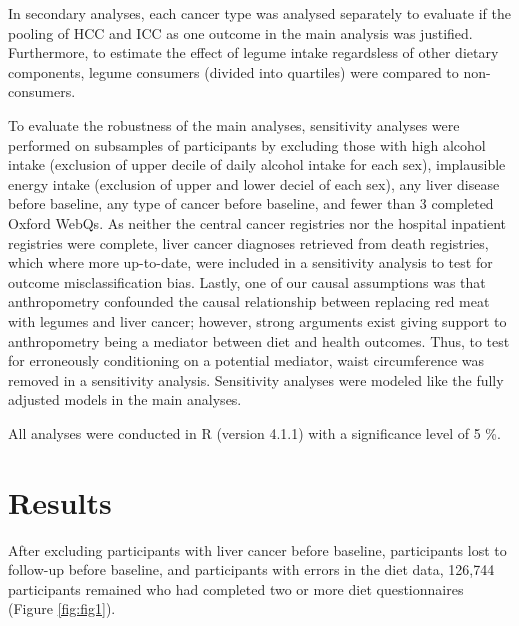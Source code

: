 \documentclass[sn-basic,Numbered,iicol,pdflatex]{sn-jnl}
\begin{document}
In secondary analyses, each cancer type was analysed separately to
evaluate if the pooling of HCC and ICC as one outcome in the main
analysis was justified. Furthermore, to estimate the effect of legume
intake regardsless of other dietary components, legume consumers
(divided into quartiles) were compared to non-consumers.

To evaluate the robustness of the main analyses, sensitivity analyses
were performed on subsamples of participants by excluding those with
high alcohol intake (exclusion of upper decile of daily alcohol intake
for each sex), implausible energy intake (exclusion of upper and lower
deciel of each sex), any liver disease before baseline, any type of
cancer before baseline, and fewer than 3 completed Oxford WebQs. As
neither the central cancer registries nor the hospital inpatient
registries were complete, liver cancer diagnoses retrieved from death
registries, which where more up-to-date, were included in a sensitivity
analysis to test for outcome misclassification bias. Lastly, one of our
causal assumptions was that anthropometry confounded the causal
relationship between replacing red meat with legumes and liver cancer;
however, strong arguments exist giving support to anthropometry being a
mediator between diet and health outcomes. Thus, to test for erroneously
conditioning on a potential mediator, waist circumference was removed in
a sensitivity analysis. Sensitivity analyses were modeled like the fully
adjusted models in the main analyses.

All analyses were conducted in R (version 4.1.1) with a significance
level of 5 \%.

\hypertarget{sec3}{%
\section{Results}\label{sec3}}

After excluding participants with liver cancer before baseline,
participants lost to follow-up before baseline, and participants with
errors in the diet data, 126,744 participants remained who had completed
two or more diet questionnaires (Figure \ref{fig:fig1}).
\end{document}
